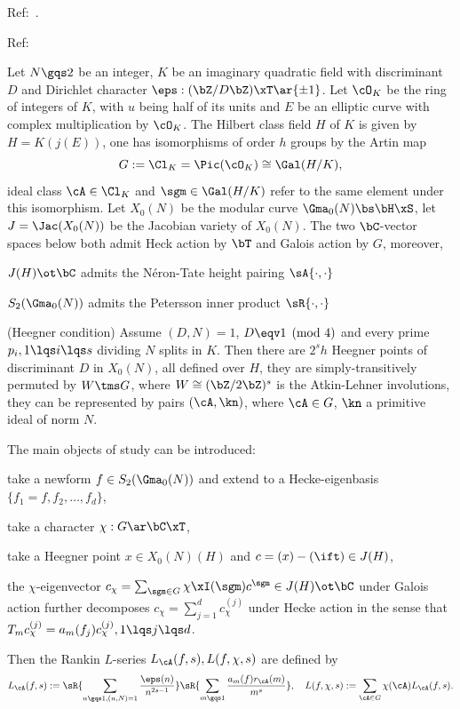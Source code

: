 \documentclass[a4paper, twoside]{article}
\begin{document}
\confighead{}{}{}



Ref:~\cite{GZ1986}.

Ref:~\cite{GZ1986,GK1993,ARGOS-intersection}


\begin{stp}
	Let $N\gqs2$ be an integer, $K$ be an imaginary quadratic field with discriminant $D$ and Dirichlet character $\eps:(\bZ/D\bZ)\xT\ar\{\pm1\}$. Let $\cO_{K}$ be the ring of integers of $K$, with $u$ being half of its units and $E$ be an elliptic curve with complex multiplication by $\cO_{K}$. The Hilbert class field $H$ of $K$ is given by $H=K(j(E))$, one has isomorphisms of order $h$ groups by the Artin map
	\[
		G:=\Cl_{K}=\Pic(\cO_{K})\cong\Gal(H/K),
	\]
	ideal class $\cA\in\Cl_{K}$ and $\sgm\in\Gal(H/K)$ refer to the same element under this isomorphism. Let $X_{0}(N)$ be the modular curve $\Gma_{0}(N)\bs\bH\xS$, let $J=\Jac(X_{0}(N))$ be the Jacobian variety of $X_{0}(N)$. The two $\bC$-vector spaces below both admit Heck action by $\bT$ and Galois action by $G$, moreover,
	\begin{itm}
		\item $J(H)\ot\bC$ admits the N{\'e}ron-Tate height pairing $\sA{\cdot,\cdot}$
		\item $S_{2}(\Gma_{0}(N))$ admits the Petersson inner product $\sR{\cdot,\cdot}$
	\end{itm}

	(Heegner condition) Assume $(D,N)=1$, $D\eqv1\pmod{4}$ and every prime $p_{i},1\lqs i\lqs s$ dividing $N$ splits in $K$. Then there are $2^{s}h$ Heegner points of discriminant $D$ in $X_{0}(N)$, all defined over $H$, they are simply-transitively permuted by $W\tms G$, where $W\cong(\bZ/2\bZ)^{s}$ is the Atkin-Lehner involutions, they can be represented by pairs $(\cA,\kn)$, where $\cA\in G$, $\kn$ a primitive ideal of norm $N$.

	The main objects of study can be introduced:
	\begin{enr}
		\item take a newform $f\in S_{2}(\Gma_{0}(N))$ and extend to a Hecke-eigenbasis $\{f_{1}=f,f_{2},\ldots,f_{d}\}$,
		\item take a character $\chi:G\ar\bC\xT$,
		\item take a Heegner point $x\in X_{0}(N)(H)$ and $c=(x)-(\ift)\in J(H)$,
	\end{enr}
	the $\chi$-eigenvector $c_{\chi}=\sum_{\sgm\in G}\chi\xI(\sgm)c^{\sgm}\in J(H)\ot\bC$ under Galois action further decomposes $c_{\chi}=\sum_{j=1}^{d}c_{\chi}^{(j)}$ under Hecke action in the sense that $T_{m}c_{\chi}^{(j)}=a_{m}(f_{j})c_{\chi}^{(j)},1\lqs j\lqs d$.

	Then the Rankin $L$-series $L_{\cA}(f,s), L(f,\chi,s)$ are defined by
	\[
		L_{\cA}(f,s):=\sR{\sum_{n\gqs1,(n,N)=1}\frac{\eps(n)}{n^{2s-1}}}\sR{\sum_{m\gqs1}\frac{a_{m}(f)r_{\cA}(m)}{m^{s}}},\quad L(f,\chi,s):=\sum_{\cA\in G}\chi(\cA)L_{\cA}(f,s).
	\]
\end{stp}
\end{document}
